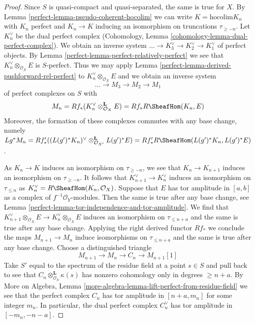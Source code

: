 \begin{proof}

Since $S$ is quasi-compact and quasi-separated, the same is true for $X$.
By Lemma \ref{perfect-lemma-pseudo-coherent-hocolim} we can write
$K = \text{hocolim} K_n$ with $K_n$ perfect and $K_n \to K$ inducing
an isomorphism on truncations $\tau_{\geq -n}$. Let $K_n^\vee$
be the dual perfect complex
(Cohomology, Lemma \ref{cohomology-lemma-dual-perfect-complex}).
We obtain an inverse system $\ldots \to K_3^\vee \to K_2^\vee \to K_1^\vee$
of perfect objects. By Lemma \ref{perfect-lemma-perfect-relatively-perfect}
we see that $K_n^\vee \otimes_{\mathcal{O}_X} E$ is $S$-perfect.
Thus we may apply Lemma \ref{perfect-lemma-derived-pushforward-rel-perfect}
to $K_n^\vee \otimes_{\mathcal{O}_X} E$ and we obtain an inverse system
$$
\ldots \to M_3 \to M_2 \to M_1
$$
of perfect complexes on $S$ with
$$
M_n = Rf_*(K_n^\vee \otimes_{\mathcal{O}_X}^\mathbf{L} E) =
Rf_*R\SheafHom(K_n, E)
$$
Moreover, the formation of these complexes commutes with any
base change, namely $Lg^*M_n =
Rf'_*((L(g')^*K_n)^\vee \otimes_{\mathcal{O}_{X'}}^\mathbf{L} L(g')^*E) =
Rf'_*R\SheafHom(L(g')^*K_n, L(g')^*E)$.

\medskip\noindent
As $K_n \to K$ induces an isomorphism on $\tau_{\geq -n}$, we see that
$K_n \to K_{n + 1}$ induces an isomorphism on $\tau_{\geq -n}$.
It follows that $K_{n + 1}^\vee \to K_n^\vee$
induces an isomorphism on $\tau_{\leq n}$ as
$K_n^\vee = R\SheafHom(K_n, \mathcal{O}_X)$.
Suppose that $E$ has tor amplitude in $[a, b]$ as a complex
of $f^{-1}\mathcal{O}_Y$-modules. Then the same is true after
any base change, see Lemma \ref{perfect-lemma-tor-independence-and-tor-amplitude}.
We find that
$K_{n + 1}^\vee \otimes_{\mathcal{O}_X} E \to
K_n^\vee \otimes_{\mathcal{O}_X} E$
induces an isomorphism on $\tau_{\leq n + a}$
and the same is true after any base change.
Applying the right derived functor $Rf_*$
we conclude the maps $M_{n + 1} \to M_n$
induce isomorphisms on $\tau_{\leq n + a}$
and the same is true after any base change.
Choose a distinguished triangle
$$
M_{n + 1} \to M_n \to C_n \to M_{n + 1}[1]
$$
Take $S'$ equal to the spectrum of the residue field at a point
$s \in S$ and pull back to see that
$C_n \otimes_{\mathcal{O}_S}^\mathbf{L} \kappa(s)$
has nonzero cohomology only in degrees $\geq n + a$. By
More on Algebra, Lemma
\ref{more-algebra-lemma-lift-perfect-from-residue-field}
we see that the perfect complex $C_n$ has tor amplitude in
$[n + a, m_n]$ for some integer $m_n$.
In particular, the dual perfect complex $C_n^\vee$ has tor amplitude in
$[-m_n, -n - a]$.


\end{proof}
